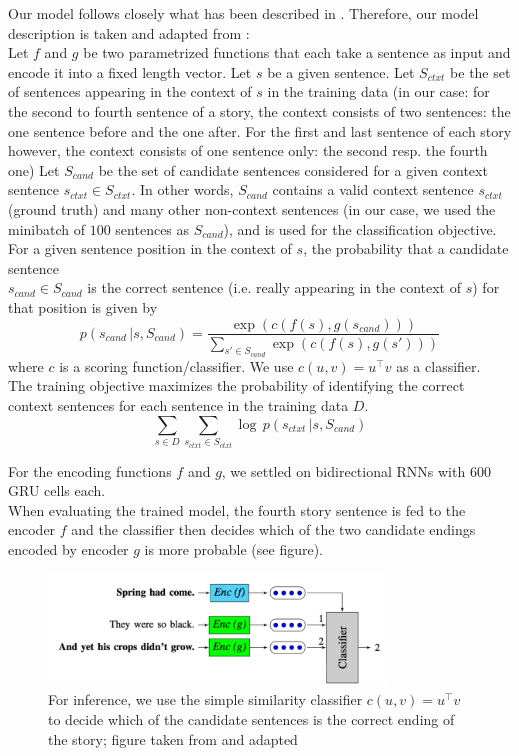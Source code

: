 \documentclass{article}
\begin{document}
Our model follows closely what has been described in \cite{eff_framework}. Therefore, our model description is taken and adapted from \cite{eff_framework}: \\[.1cm]
Let $f$ and $g$ be two parametrized functions that each take a sentence as input and encode it into a fixed length vector. Let $s$ be a given sentence. Let $S_{ctxt}$ be the set of sentences appearing in the context of $s$ in the training data (in our case: for the second to fourth sentence of a story, the context consists of two sentences: the one sentence before and the one after. For the first and last sentence of each story however, the context consists of one sentence only: the second resp. the fourth one) Let $S_{cand}$ be the set of candidate sentences considered for a given context sentence $s_{ctxt} \in S_{ctxt}$. In other words, $S_{cand}$ contains a valid context sentence $s_{ctxt}$ (ground truth) and many other non-context sentences (in our case, we used the minibatch of $100$ sentences as $S_{cand}$), and is used for the classification objective. \\[.2cm]
For a given sentence position in the context of $s$, the probability that a candidate sentence \\$s_{cand}\in S_{cand}$ is the correct sentence (i.e. really appearing in the context of $s$) for that position is given by
$$
p(s_{cand} \, | s, S_{cand}) = \frac{\exp(c(f(s), g(s_{cand})))}{\sum_{s'\in S_{cand}}\exp(c(f(s), g(s')))}
$$
where $c$ is  a scoring function/classifier. We use $c(u, v) = u^\top v$ as  a classifier. \\[.3cm]
The training objective maximizes the probability of identifying the correct context sentences for each sentence in the training data $D$.
$$
\sum_{s\in D} \sum_{s_{ctxt} \in S_{ctxt}} \log \, p(s_{ctxt} \, | s, S_{cand})
$$

For the encoding functions $f$ and $g$, we settled on bidirectional RNNs with 600 GRU cells each. \\[.1cm]
When evaluating the trained model, the fourth story sentence is fed to the encoder $f$ and the classifier then decides which of the two candidate endings encoded by encoder $g$ is more probable (see figure).
\begin{figure}[h]
\includegraphics[width=0.8\textwidth]{fig_architecture_test}


\caption{For inference, we use the simple similarity classifier $c(u, v) = u^\top v$ to decide which of the candidate sentences is the correct ending of the story; figure taken from \cite{eff_framework} and adapted}
\end{figure}
\end{document}
